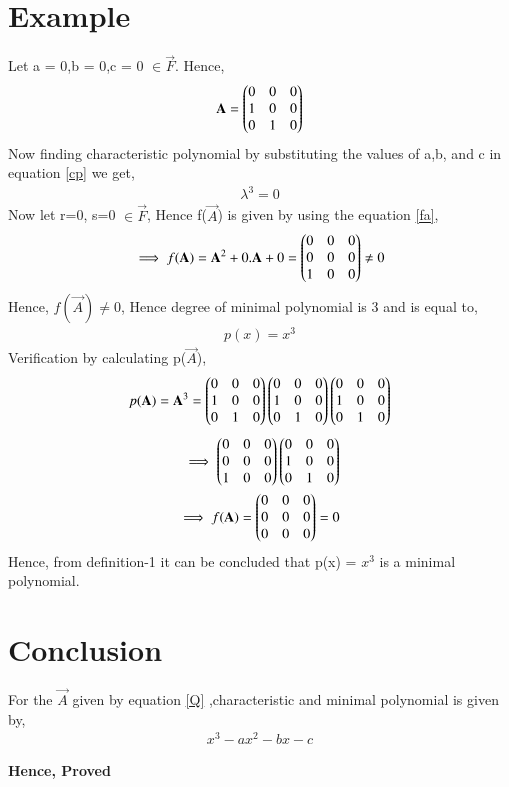 \documentclass[journal,12pt,twocolumn]{IEEEtran}
\begin{document}
\section{Example}
Let a = 0,b = 0,c = 0 $\in \vec{F}$. Hence,
\begin{align}
\mathbf{A} = \begin{pmatrix}0&0&0\\1&0&0\\0&1&0\end{pmatrix}
\end{align}
Now finding characteristic polynomial by substituting the values of a,b, and c in equation \eqref{cp} we get,
\begin{align}
\lambda^3 = 0
\end{align}
Now let r=0, s=0 $\in \vec{F}$,
Hence f($\vec{A}$) is given by using the equation \eqref{fa},
\begin{align}
\implies f(\mathbf{A}) = \mathbf{A}^2+0.\mathbf{A}+0 = \begin{pmatrix}0&0&0\\0&0&0\\1&0&0\end{pmatrix} \neq 0
\end{align}
Hence, $f(\vec{A})\neq 0$, Hence degree of minimal polynomial is 3 and is equal to,
\begin{align}
p(x) = x^3
\end{align}
Verification by calculating p($\vec{A}$),
\begin{align}
p(\mathbf{A}) = \mathbf{A}^3 = \begin{pmatrix}0&0&0\\1&0&0\\0&1&0\end{pmatrix}\begin{pmatrix}0&0&0\\1&0&0\\0&1&0\end{pmatrix}\begin{pmatrix}0&0&0\\1&0&0\\0&1&0\end{pmatrix}
\end{align}
\begin{align}
\implies \begin{pmatrix}0&0&0\\0&0&0\\1&0&0\end{pmatrix}\begin{pmatrix}0&0&0\\1&0&0\\0&1&0\end{pmatrix}\\
\implies f(\mathbf{A}) = \begin{pmatrix}0&0&0\\0&0&0\\0&0&0\end{pmatrix} = 0
\end{align}
Hence, from definition-1 it can be concluded that p(x) = $x^3$ is a minimal polynomial.
\section{Conclusion}
For the $\vec{A}$ given by equation \eqref{Q} ,characteristic and minimal polynomial is given by,
\begin{align}
x^3-ax^2-bx-c
\end{align}
\begin{center}
\textbf{Hence, Proved}
\end{center}
\end{document}
